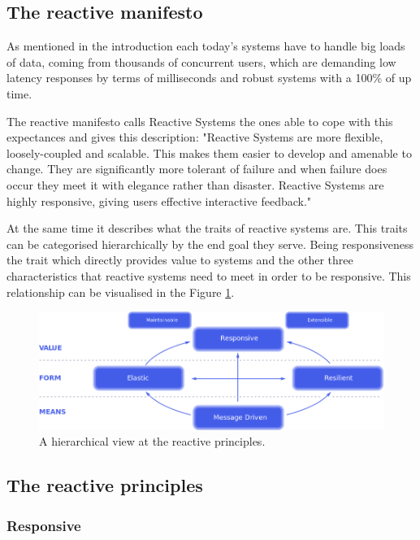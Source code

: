 \documentclass[../main.tex]{subfiles}
\begin{document}
\subsection{The reactive manifesto} As mentioned in the introduction each
today's systems have to handle big loads of data, coming from thousands of
concurrent users, which are demanding low latency responses by terms of
milliseconds and robust systems with a 100\% of up time.

The reactive manifesto \autocite{2014TheManifesto} calls Reactive Systems the
ones able to cope with this expectances and gives this description: "Reactive
Systems are more flexible, loosely-coupled and scalable. This makes them easier
to develop and amenable to change. They are significantly more tolerant of
failure and when failure does occur they meet it with elegance rather than
disaster. Reactive Systems are highly responsive, giving users effective
interactive feedback."


At the same time it describes what the traits of reactive systems are. This
traits can be categorised hierarchically by the end goal they serve. Being
responsiveness the trait which directly provides value to systems and the other
three characteristics that reactive systems need to meet in order to be
responsive. This relationship can be visualised in the Figure
\ref{fig:reactive}.

\begin{figure}[ht] \centering
\includegraphics[width=1\textwidth]{images/reactive-traits.png}
    \caption{A hierarchical view at the reactive principles.}
    \label{fig:reactive}
\end{figure}

\subsection{The reactive principles}
\subsubsection{Responsive}
\end{document}
